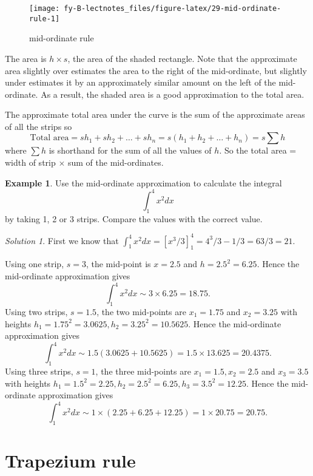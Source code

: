 \documentclass[
  11pt,
  oneside]{book}
\newcommand{\slide}{}
\theoremstyle{definition}
\theoremstyle{definition}
\newtheorem{example}{Example}[chapter]
\theoremstyle{definition}
\theoremstyle{definition}
\theoremstyle{remark}
\newtheorem*{solution}{Solution}
\begin{document}
\begin{figure}

{\centering \texttt{[image: fy-B-lectnotes\_files/figure-latex/29-mid-ordinate-rule-1]} 

}

\caption{mid-ordinate rule}\label{fig:29-mid-ordinate-rule}
\end{figure}

The area is \(h \times s\), the area of the shaded rectangle. Note that the approximate area slightly over estimates the area to the right of the mid-ordinate, but slightly under estimates it by an approximately similar amount on the left of the mid-ordinate. As a result, the shaded area is a good approximation to the total area.

The approximate total area under the curve is the sum of the approximate areas of all the strips so
\[
\text{Total area} = sh_1 + sh_2 + \ldots + sh_n = s(h_1 + h_2 + \ldots + h_n) = s\sum h
\]
where \(\sum h\) is shorthand for the sum of all the values of \(h\). So the total area = width of strip \(\times\) sum of the mid-ordinates.

\slide

\begin{example}
Use the mid-ordinate approximation to calculate the integral
\[
\int_1^4x^2dx
\]
by taking 1, 2 or 3 strips. Compare the values with the correct value.
\end{example}

\begin{solution}
First we know that \(\displaystyle\int_1^4 x^2 dx = [x^3/3]_1^4 = 4^3/3-1/3 = 63/3 = 21\).

Using one strip, \(s=3\), the mid-point is \(x=2.5\) and \(h=2.5^2 = 6.25\). Hence the mid-ordinate approximation gives
\[
\int_1^4 x^2 dx \sim 3\times 6.25 = 18.75.
\]
Using two strips, \(s=1.5\), the two mid-points are \(x_1=1.75\) and \(x_2=3.25\) with heights \(h_1=1.75^2=3.0625, h_2=3.25^2=10.5625\). Hence the mid-ordinate approximation gives
\[
\int_1^4 x^2 dx \sim 1.5(3.0625+10.5625)=1.5\times13.625 = 20.4375.
\]
Using three strips, \(s=1\), the three mid-points are \(x_1=1.5, x_2=2.5\) and \(x_3=3.5\) with heights \(h_1=1.5^2=2.25, h_2=2.5^2=6.25, h_3=3.5^2=12.25\). Hence the mid-ordinate approximation gives
\[
\int_1^4 x^2 dx \sim 1\times(2.25+6.25+12.25)=1\times20.75 = 20.75.
\]
\end{solution}

\slide

\section{Trapezium rule}\label{trapezium-rule}
\end{document}
